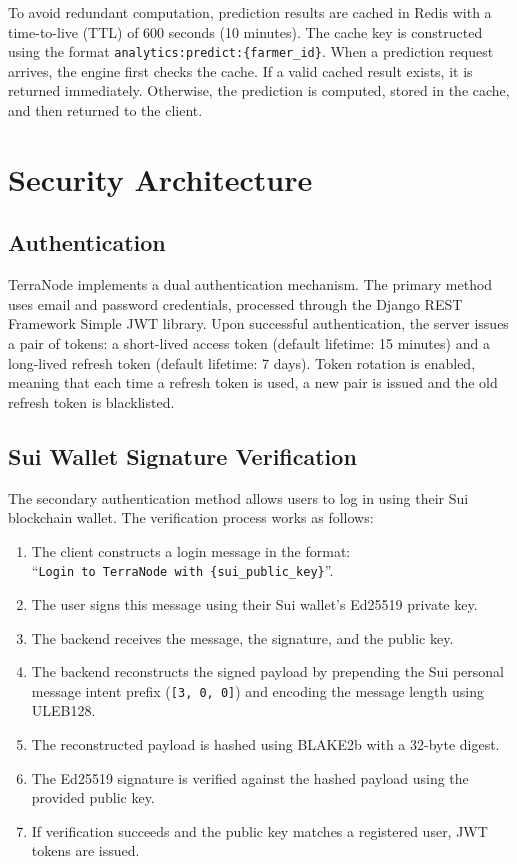 To avoid redundant computation, prediction results are cached in Redis with a time-to-live (TTL) of 600 seconds (10 minutes). The cache key is constructed using the format \texttt{analytics:}\allowbreak\texttt{predict:}\allowbreak\texttt{\{farmer\_id\}}. When a prediction request arrives, the engine first checks the cache. If a valid cached result exists, it is returned immediately. Otherwise, the prediction is computed, stored in the cache, and then returned to the client.

\section{Security Architecture}

\subsection{Authentication}

TerraNode implements a dual authentication mechanism. The primary method uses email and password credentials, processed through the Django REST Framework Simple JWT library. Upon successful authentication, the server issues a pair of tokens: a short-lived access token (default lifetime: 15 minutes) and a long-lived refresh token (default lifetime: 7 days). Token rotation is enabled, meaning that each time a refresh token is used, a new pair is issued and the old refresh token is blacklisted.

\subsection{Sui Wallet Signature Verification}
\label{sec:wallet_verify}

The secondary authentication method allows users to log in using their Sui blockchain wallet. The verification process works as follows:

\begin{enumerate}
    \item The client constructs a login message in the format: \\ ``\texttt{Login to TerraNode with \{sui\_public\_key\}}''.
    \item The user signs this message using their Sui wallet's Ed25519 private key.
    \item The backend receives the message, the signature, and the public key.
    \item The backend reconstructs the signed payload by prepending the Sui personal message intent prefix (\texttt{[3, 0, 0]}) and encoding the message length using ULEB128.
    \item The reconstructed payload is hashed using BLAKE2b with a 32-byte digest.
    \item The Ed25519 signature is verified against the hashed payload using the provided public key.
    \item If verification succeeds and the public key matches a registered user, JWT tokens are issued.
\end{enumerate}

